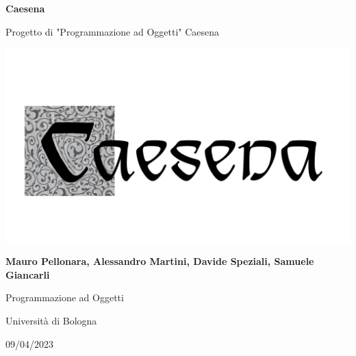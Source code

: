 \documentclass[italian, a4paper, 12pt]{article}
\begin{document}
\begin{titlepage}
    \begin{center}
        \vspace*{1cm}

        \textbf{\Huge Caesena}

        \vspace{1cm}

        {\LARGE Progetto di "Programmazione ad Oggetti" Caesena}

        \vfill

        {\includegraphics[scale=.6]{images/caesena.png}}

        \vfill

        \textbf{\Large Mauro Pellonara, Alessandro Martini, Davide Speziali, Samuele Giancarli}

        \vspace{1cm}

        {\large Programmazione ad Oggetti}

        \vspace{0.3cm}

        {\large Università di Bologna}

        \vspace{0.3cm}

        {\large 09/04/2023}
    \end{center}
\end{titlepage}

\tableofcontents
\newpage


\clearpage

\clearpage

\clearpage

\clearpage

\clearpage

\clearpage

\end{document}
